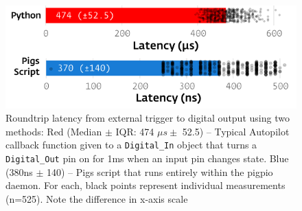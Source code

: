 \begin{figure}[hb!]
\caption{Roundtrip latency from external trigger to digital output using two methods: Red (Median $\pm$ IQR: 474 $\mu s \pm$ 52.5) -- Typical Autopilot callback function given to a \texttt{Digital\_In} object that turns a \texttt{Digital\_Out} pin on for 1ms when an input pin changes state. Blue (380ns $\pm$ 140) -- Pigs script that runs entirely within the pigpio daemon. For each, black points represent individual measurements (n=525). Note the difference in x-axis scale}
\label{fig:gpiort}
\includegraphics{figures/gpio_roundtrip.pdf}
\end{figure}




